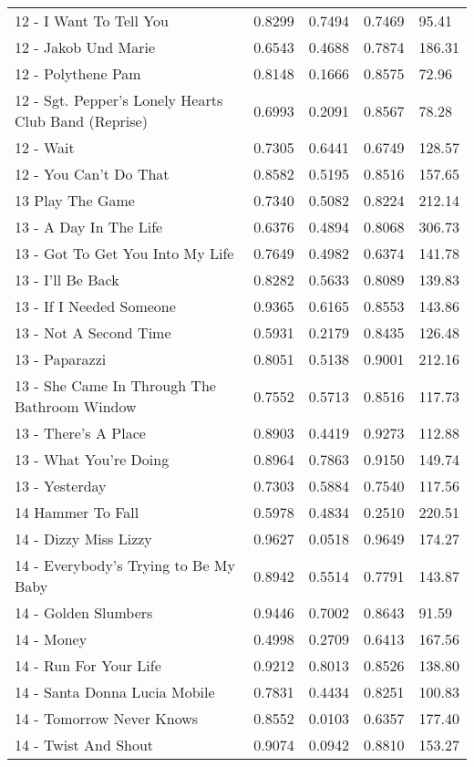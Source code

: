 \begin{longtable}[c]{|p{8cm}|c|l|l|l|}
12 - I Want To Tell You & 0.8299 & 0.7494 & 0.7469 & 95.41 \\
12 - Jakob Und Marie & 0.6543 & 0.4688 & 0.7874 & 186.31 \\
12 - Polythene Pam & 0.8148 & 0.1666 & 0.8575 & 72.96 \\
12 - Sgt. Pepper's Lonely Hearts Club Band (Reprise) & 0.6993 & 0.2091 & 0.8567 & 78.28 \\
12 - Wait & 0.7305 & 0.6441 & 0.6749 & 128.57 \\
12 - You Can't Do That & 0.8582 & 0.5195 & 0.8516 & 157.65 \\
13 Play The Game & 0.7340 & 0.5082 & 0.8224 & 212.14 \\
13 - A Day In The Life & 0.6376 & 0.4894 & 0.8068 & 306.73 \\
13 - Got To Get You Into My Life & 0.7649 & 0.4982 & 0.6374 & 141.78 \\
13 - I'll Be Back & 0.8282 & 0.5633 & 0.8089 & 139.83 \\
13 - If I Needed Someone & 0.9365 & 0.6165 & 0.8553 & 143.86 \\
13 - Not A Second Time & 0.5931 & 0.2179 & 0.8435 & 126.48 \\
13 - Paparazzi & 0.8051 & 0.5138 & 0.9001 & 212.16 \\
13 - She Came In Through The Bathroom Window & 0.7552 & 0.5713 & 0.8516 & 117.73 \\
13 - There's A Place & 0.8903 & 0.4419 & 0.9273 & 112.88 \\
13 - What You're Doing & 0.8964 & 0.7863 & 0.9150 & 149.74 \\
13 - Yesterday & 0.7303 & 0.5884 & 0.7540 & 117.56 \\
14 Hammer To Fall & 0.5978 & 0.4834 & 0.2510 & 220.51 \\
14 - Dizzy Miss Lizzy & 0.9627 & 0.0518 & 0.9649 & 174.27 \\
14 - Everybody's Trying to Be My Baby & 0.8942 & 0.5514 & 0.7791 & 143.87 \\
14 - Golden Slumbers & 0.9446 & 0.7002 & 0.8643 & 91.59 \\
14 - Money & 0.4998 & 0.2709 & 0.6413 & 167.56 \\
14 - Run For Your Life & 0.9212 & 0.8013 & 0.8526 & 138.80 \\
14 - Santa Donna Lucia Mobile & 0.7831 & 0.4434 & 0.8251 & 100.83 \\
14 - Tomorrow Never Knows & 0.8552 & 0.0103 & 0.6357 & 177.40 \\
14 - Twist And Shout & 0.9074 & 0.0942 & 0.8810 & 153.27 \\

\end{longtable}
